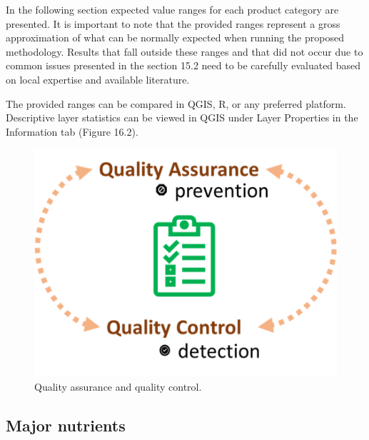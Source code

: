 \documentclass[
  10pt,
  b5paper,
  oneside]{book}
\begin{document}
In the following section expected value ranges for each product category are presented. It is important to note that the provided ranges represent a gross approximation of what can be normally expected when running the proposed methodology. Results that fall outside these ranges and that did not occur due to common issues presented in the section 15.2 need to be carefully evaluated based on local expertise and available literature.

The provided ranges can be compared in QGIS, R, or any preferred platform. Descriptive layer statistics can be viewed in QGIS under Layer Properties in the Information tab (Figure 16.2).

\begin{figure}
\includegraphics[width=6.43in]{images/QA_QC} \caption{Quality assurance and quality control.}\label{fig:qgis}
\end{figure}

\hypertarget{major-nutrients}{%
\subsection*{Major nutrients}\label{major-nutrients}}
\end{document}
